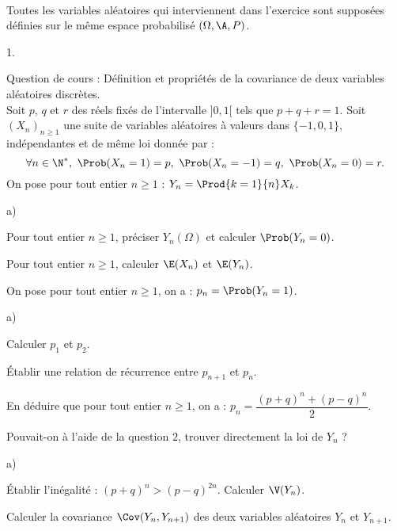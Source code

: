 \documentclass[11pt]{article}%
\begin{document}
\begin{exerciceAP}~\\
  Toutes les variables aléatoires qui interviennent dans l'exercice
  sont supposées définies sur le même espace probabilisé
  $(\Omega,\A,P)$.
  \begin{noliste}{1.}
    \setlength{\itemsep}{2mm}
  \item Question de cours : Définition et propriétés de la covariance
    de deux variables aléatoires discrètes.\\
    Soit $p$, $q$ et $r$ des réels fixés de l'intervalle $]0,1[$ tels
    que $p+q+r=1$. Soit $(X_n)_{n\geq 1}$ une suite de variables
    aléatoires à valeurs dans $\{-1,0,1\}$, indépendantes et de même
    loi donnée par :
    \[
    \forall n \in\N^*, \ \Prob(X_n=1)=p, \ \Prob(X_n=-1)=q, \ \Prob(X_n=0)=r.
    \]
    On pose pour tout entier $n\geq 1$ : $Y_n=\Prod{k=1}{n} X_k$.
  \item 
    \begin{noliste}{a)}
    \setlength{\itemsep}{2mm}
    \item Pour tout entier $n\geq 1$, préciser $Y_n(\Omega)$ et
      calculer $\Prob(Y_n=0)$.
    \item Pour tout entier $n\geq 1$, calculer $\E(X_n)$ et $\E(Y_n)$.
    \end{noliste}
  \item On pose pour tout entier $n\geq 1$, on a : $p_n=\Prob(Y_n=1)$.
    \begin{noliste}{a)}
    \setlength{\itemsep}{2mm}
    \item Calculer $p_1$ et $p_2$.
    \item Établir une relation de récurrence entre $p_{n+1}$ et
      $p_n$.
    \item En déduire que pour tout entier $n\geq 1$, on a :
      $p_n=\dfrac{(p+q)^n +(p-q)^n}{2}$.
    \item Pouvait-on à l'aide de la question $2$, trouver directement
      la loi de $Y_n$ ?
    \end{noliste}
  \item
    \begin{noliste}{a)}
    \setlength{\itemsep}{2mm}
    \item Établir l'inégalité : $(p+q)^n > (p-q)^{2n}$. Calculer
      $\V(Y_n)$.
    \item Calculer la covariance $\Cov(Y_n,Y_{n+1})$ des deux
      variables aléatoires $Y_n$ et $Y_{n+1}$.
    \end{noliste}
  \end{noliste}
\end{exerciceAP}
\end{document}
